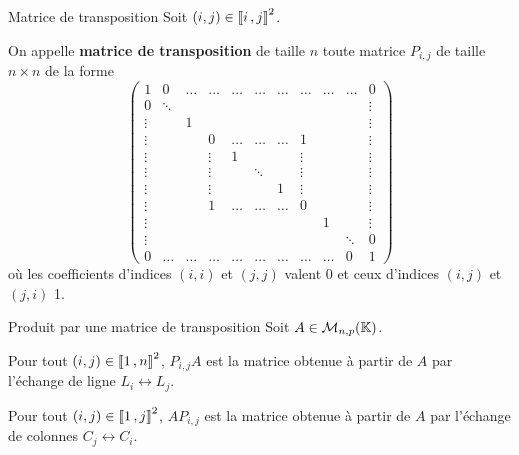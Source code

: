     \begin{defi}{Matrice de transposition}{}
        Soit $(i,j) \in \left\llbracket i \, , j \right\rrbracket^2$.

        On appelle \textbf{matrice de transposition} de taille $n$ toute matrice $P_{i,j}$ de taille $n \times n$ de la forme 
        \[ \begin{pmatrix}
            1 & 0 & \ldots & \ldots & \ldots & \ldots & \ldots & \ldots & \ldots & \ldots & 0 \\
            0 & \ddots &  &  &  &  &  &  &  &  & \vdots \\
            \vdots &  & 1 &  &  &  &  &  &  &  & \vdots \\
            \vdots &  &  & 0 & \ldots & \ldots & \ldots & 1 &  &  & \vdots \\
            \vdots &  &  & \vdots & 1 &  &  & \vdots &  &  & \vdots \\
            \vdots &  &  & \vdots &  & \ddots &  & \vdots &  &  & \vdots \\
            \vdots &  &  & \vdots &  &  & 1 & \vdots &  &  & \vdots \\
            \vdots &  &  & 1 & \ldots & \ldots & \ldots & 0 &  &  & \vdots \\
            \vdots &  &  &  &  &  &  &  & 1 &  & \vdots \\
            \vdots &  &  &  &  &  &  &  &  & \ddots & 0 \\
            0 & \ldots & \ldots & \ldots & \ldots & \ldots & \ldots & \ldots & \ldots & 0 & 1 
            \end{pmatrix} \] 
            où les coefficients d’indices $(i,i)$ et $(j,j)$ valent 0 et ceux d’indices $(i,j)$ et $(j,i)$ 1.
    \end{defi}

    \begin{prop}{Produit par une matrice de transposition}{}
        Soit $A \in \mathcal{M}_{n,p}(\mathbb{K})$.

        \begin{alors}
            \item Pour tout $(i,j) \in \left\llbracket 1 \, , n \right\rrbracket^2$, $P_{i,j}A$ est la matrice obtenue à partir de $A$ par l’échange de ligne $L_i \leftrightarrow L_j$.
            \item Pour tout $(i,j) \in \left\llbracket 1 \, , j \right\rrbracket^2$, $AP_{i,j}$ est la matrice obtenue à partir de $A$ par l’échange de colonnes $C_j \leftrightarrow C_i$.
        \end{alors}
    \end{prop}

